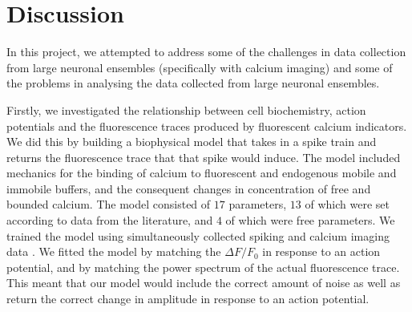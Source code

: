 \chapter{Discussion}

In this project, we attempted to address some of the challenges in data collection from large neuronal ensembles (specifically with calcium imaging) and some of the problems in analysing the data collected from large neuronal ensembles.

Firstly, we investigated the relationship between cell biochemistry, action potentials and the fluorescence traces produced by fluorescent calcium indicators. We did this by building a biophysical model that takes in a spike train and returns the fluorescence trace that that spike would induce. The model included mechanics for the binding of calcium to fluorescent and endogenous mobile and immobile buffers, and the consequent changes in concentration of free and bounded calcium. The model consisted of $17$ parameters, $13$ of which were set according to data from the literature, and $4$ of which were free parameters. We trained the model using simultaneously collected spiking and calcium imaging data \parencite{berens}. We fitted the model by matching the $\Delta F/F_0$ in response to an action potential, and by matching the power spectrum of the actual fluorescence trace. This meant that our model would include the correct amount of noise as well as return the correct change in amplitude in response to an action potential.

